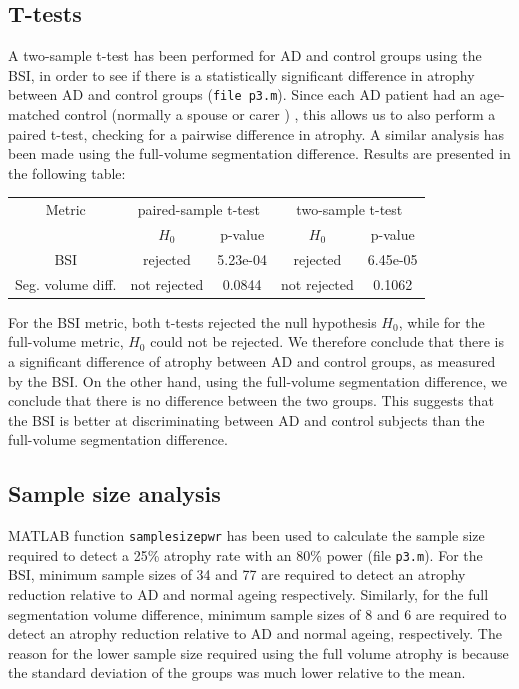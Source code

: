 \documentclass[11pt,a4paper,oneside]{report}
\begin{document}
\subsection*{T-tests}

A two-sample t-test has been performed for AD and control groups using the BSI, in order to see if there is a statistically significant difference in atrophy between AD and control groups (\texttt{file p3.m}). Since each AD patient had an age-matched control (normally a spouse or carer ) \cite{malone2013miriad}, this allows us to also perform a paired t-test, checking for a pairwise difference in atrophy. A similar analysis has been made using the full-volume segmentation difference. Results are presented in the following table:\\

\begin{center}
 \begin{tabular}{c | c | c | c | c}
 Metric & \multicolumn{2}{c|}{paired-sample t-test} & \multicolumn{2}{c}{two-sample t-test}\\  
 & $H_0$ & p-value & $H_0$ & p-value\\
 \hline
 BSI & \cellcolor{green!15} rejected & 5.23e-04& \cellcolor{green!15}rejected & 6.45e-05\\
 Seg. volume diff. & \cellcolor{red!15} not rejected & 0.0844 & \cellcolor{red!15} not rejected & 0.1062\\
 \end{tabular}
\end{center}

For the BSI metric, both t-tests rejected the null hypothesis $H_0$, while for the full-volume metric, $H_0$ could not be rejected. We therefore conclude that there is a significant difference of atrophy between AD and control groups, as measured by the BSI. On the other hand, using the full-volume segmentation difference, we conclude that there is no difference between the two groups. This suggests that the BSI is better at discriminating between AD and control subjects than the full-volume segmentation difference. 

\subsection*{Sample size analysis}

MATLAB function \texttt{samplesizepwr} has been used to calculate the sample size required to detect a 25\% atrophy rate with an 80\% power (file \texttt{p3.m}). For the BSI, minimum sample sizes of 34 and 77 are required to detect an atrophy reduction relative to AD and normal ageing respectively. Similarly, for the full segmentation volume difference, minimum sample sizes of 8 and 6 are required to detect an atrophy reduction relative to AD and normal ageing, respectively. The reason for the lower sample size required using the full volume atrophy is because the standard deviation of the groups was much lower relative to the mean.
\end{document}

